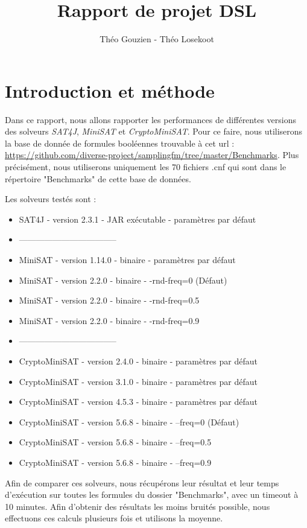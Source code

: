 \documentclass[11pt,a4paper]{article}
\author{Théo Gouzien - Théo Losekoot}
\title{Rapport de projet DSL}
\begin{document}
\maketitle

\section{Introduction et méthode}

Dans ce rapport, nous allons rapporter les performances de différentes versions des solveurs \textit{SAT4J}, \textit{MiniSAT} et \textit{CryptoMiniSAT}.
Pour ce faire, nous utiliserons la base de donnée de formules booléennes trouvable à cet url : \url{https://github.com/diverse-project/samplingfm/tree/master/Benchmarks}.
Plus précisément, nous utiliserons uniquement les 70 fichiers .cnf qui sont dans le répertoire "Benchmarks" de cette base de données.

Les solveurs testés sont : 
\begin{itemize}
\item SAT4J - version 2.3.1 - JAR exécutable - paramètres par défaut 
\item -----------------------------------
\item MiniSAT - version 1.14.0 - binaire - paramètres par défaut
\item MiniSAT - version 2.2.0  - binaire - -rnd-freq=0 (Défaut)
\item MiniSAT - version 2.2.0  - binaire - -rnd-freq=0.5
\item MiniSAT - version 2.2.0  - binaire - -rnd-freq=0.9
\item -----------------------------------
\item CryptoMiniSAT - version 2.4.0 - binaire - paramètres par défaut
\item CryptoMiniSAT - version 3.1.0 - binaire - paramètres par défaut
\item CryptoMiniSAT - version 4.5.3 - binaire - paramètres par défaut
\item CryptoMiniSAT - version 5.6.8 - binaire - --freq=0 (Défaut)
\item CryptoMiniSAT - version 5.6.8 - binaire - --freq=0.5
\item CryptoMiniSAT - version 5.6.8 - binaire - --freq=0.9
\end{itemize}

Afin de comparer ces solveurs, nous récupérons leur résultat et leur temps d'exécution sur toutes les formules du dossier "Benchmarks", avec un timeout à 10 minutes. 
Afin d'obtenir des résultats les moins bruités possible, nous effectuons ces calculs plusieurs fois et utilisons la moyenne.
\end{document}
